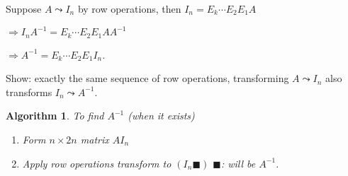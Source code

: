 \documentclass[12pt]{article}
\theoremstyle{plain}
\newtheorem{algorithm}{Algorithm}[subsection]
\begin{document}
Suppose $A \leadsto I_n$ by row operations, then $I_n = E_k \cdots E_2 E_1 A$


$\Rightarrow I_n A^{-1} = E_k \cdots E_2 E_1 A A^{-1}$ 

$\Rightarrow A^{-1} = E_k \cdots E_2 E_1 I_n$. 

Show: exactly the same sequence of row operations, transforming $A \leadsto I_n$
also transforms $I_n \leadsto A^{-1}$. 


\begin{algorithm}
	To find $A^{-1}$ (when it exists) 
	\begin{enumerate}
		\item Form $n \times 2n$ matrix $A I_n$ 
		\item Apply row operations transform to $(I_n  \blacksquare)$ 
			$\blacksquare$: will be $A^{-1}$.  \\
	\end{enumerate}
\end{algorithm}
\end{document}
